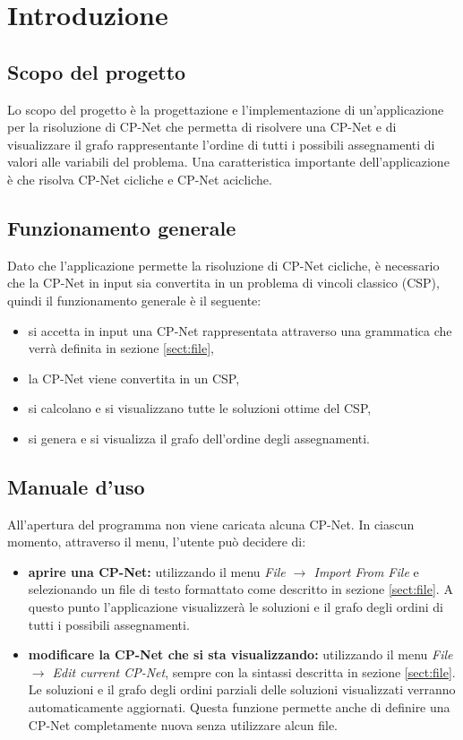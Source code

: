\section{Introduzione}


\subsection{Scopo del progetto}
Lo scopo del progetto è la progettazione e l'implementazione di
un'applicazione per la risoluzione di CP-Net che permetta di risolvere
una CP-Net e di visualizzare il grafo rappresentante l'ordine di tutti
i possibili assegnamenti di valori alle variabili del problema.  Una
caratteristica importante dell'applicazione è che risolva CP-Net
cicliche e CP-Net acicliche.

\subsection{Funzionamento generale}
Dato che l'applicazione permette la risoluzione di CP-Net cicliche, è
necessario che la CP-Net in input sia convertita in un problema di
vincoli classico (CSP), quindi il funzionamento generale è il
seguente:
\begin{itemize}
\item si accetta in input una CP-Net rappresentata attraverso una
  grammatica che verrà definita in sezione \ref{sect:file},
\item la CP-Net viene convertita in un CSP,
\item si calcolano e si visualizzano tutte le soluzioni ottime del
  CSP,
\item si genera e si visualizza il grafo dell'ordine degli
  assegnamenti.
\end{itemize}

\subsection{Manuale d'uso}

All'apertura del programma non viene caricata alcuna CP-Net.  In
ciascun momento, attraverso il menu, l'utente può decidere di:
\begin{itemize}

\item \textbf{aprire una CP-Net:} utilizzando il menu \textit{File
    $\rightarrow$ Import From File} e selezionando un file di testo
  formattato come descritto in sezione \ref{sect:file}. A questo punto
  l'applicazione visualizzerà le soluzioni e il grafo degli ordini di
  tutti i possibili assegnamenti.

\item \textbf{modificare la CP-Net che si sta visualizzando:}
  utilizzando il menu \textit{File $\rightarrow$ Edit current CP-Net},
  sempre con la sintassi descritta in sezione \ref{sect:file}. Le
  soluzioni e il grafo degli ordini parziali delle soluzioni
  visualizzati verranno automaticamente aggiornati. Questa funzione
  permette anche di definire una CP-Net completamente nuova senza
  utilizzare alcun file.

\end{itemize}

